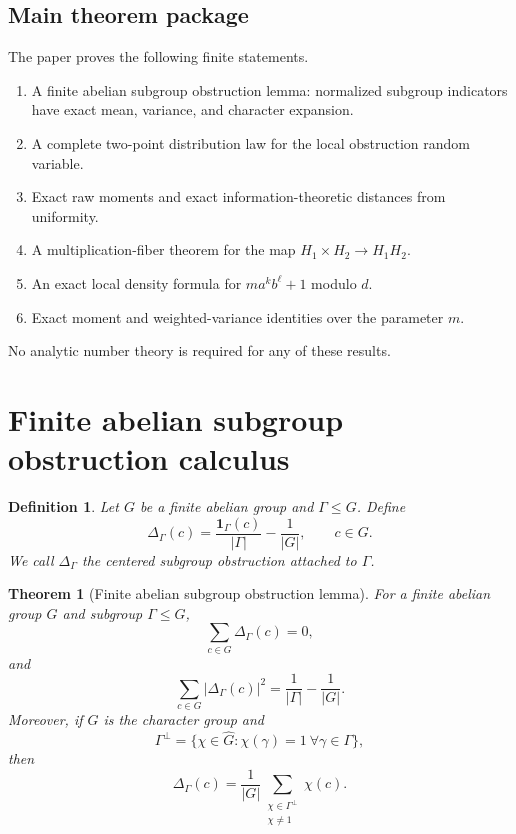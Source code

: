 \documentclass[11pt]{article}
\newtheorem{theorem}{Theorem}
\newtheorem{definition}{Definition}
\newcommand{\1}{\mathbf 1}
\begin{document}
\subsection*{Main theorem package}

The paper proves the following finite statements.

\begin{enumerate}[leftmargin=1.5em]
\item A finite abelian subgroup obstruction lemma: normalized subgroup indicators have exact mean, variance, and character expansion.
\item A complete two-point distribution law for the local obstruction random variable.
\item Exact raw moments and exact information-theoretic distances from uniformity.
\item A multiplication-fiber theorem for the map \(H_1\times H_2\to H_1H_2\).
\item An exact local density formula for \(m a^k b^\ell+1\) modulo \(d\).
\item Exact moment and weighted-variance identities over the parameter \(m\).
\end{enumerate}

No analytic number theory is required for any of these results.

\section{Finite abelian subgroup obstruction calculus}

\begin{definition}
Let \(G\) be a finite abelian group and \(\Gamma\le G\).  Define
\[
\Delta_\Gamma(c)=\frac{\1_\Gamma(c)}{|\Gamma|}-\frac1{|G|},\qquad c\in G.
\]
We call \(\Delta_\Gamma\) the centered subgroup obstruction attached to \(\Gamma\).
\end{definition}

\begin{theorem}[Finite abelian subgroup obstruction lemma]\label{T:finite}
For a finite abelian group \(G\) and subgroup \(\Gamma\le G\),
\[
\sum_{c\in G}\Delta_\Gamma(c)=0,
\]
and
\[
\sum_{c\in G}|\Delta_\Gamma(c)|^2=\frac1{|\Gamma|}-\frac1{|G|}.
\]
Moreover, if \(\widehat G\) is the character group and
\[
\Gamma^\perp=\{\chi\in\widehat G:\chi(\gamma)=1\ \forall \gamma\in\Gamma\},
\]
then
\[
\Delta_\Gamma(c)=
\frac1{|G|}
\sum_{\substack{\chi\in\Gamma^\perp\\ \chi\ne1}}\chi(c).
\]
\end{theorem}
\end{document}
